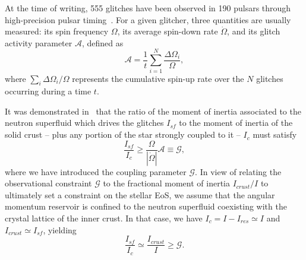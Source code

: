 At the time of writing, 555 glitches have been observed in 190 pulsars through 
high-precision pulsar timing~\cite{Espinoza2011,Glitches}. For a given 
glitcher, three quantities are usually measured: its spin frequency $\Omega$, 
its average spin-down rate $\dot{\Omega}$, and its glitch activity parameter
$\mathcal{A}$, defined as
%
\begin{equation}
  \mathcal{A} = \frac{1}{t}\sum_{i=1}^{N} \frac{\Delta \Omega_i}{\Omega},
\end{equation}
%
where $\sum_i \Delta\Omega_i/\Omega$ represents the cumulative spin-up rate
over the $N$ glitches occurring during a time $t$.

It was demonstrated in~\cite{Link1999} that the ratio of the moment of inertia
associated to the neutron superfluid which drives the glitches $I_{sf}$ to the 
moment of inertia of the solid crust -- plus any portion of the star strongly 
coupled to it -- $I_c$ must satisfy 
%
\begin{equation}
  \frac{I_{sf}}{I_c} \geq \frac{\Omega}{|\dot{\Omega}|}\mathcal{A} 
  \equiv \mathcal{G},
\end{equation}
%
where we have introduced the coupling parameter $\mathcal{G}$. In view of
relating the observational constraint $\mathcal{G}$ to the fractional moment of
inertia $I_{crust}/I$ to ultimately set a constraint on the stellar EoS, we 
assume that the angular momentum reservoir is confined to the neutron 
superfluid coexisting with the crystal lattice of the inner crust. 
%
%
In that case, we have $I_c = I - I_{res} \simeq I$ and 
$I_{crust} \simeq I_{sf}$, yielding~\cite{Link1999}
%
\begin{equation}
  \frac{I_{sf}}{I_c} \simeq \frac{I_{crust}}{I} 
  \geq \mathcal{G}\label{eq:noent}.
\end{equation}
%


